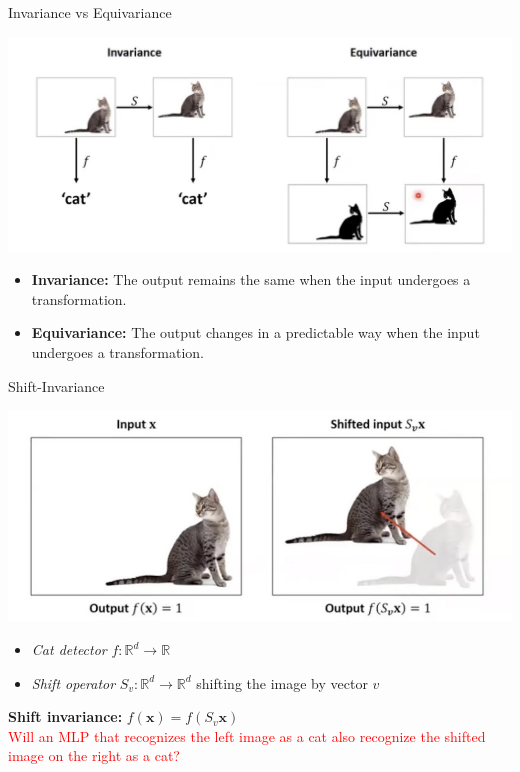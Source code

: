 \documentclass[serif, aspectratio=169]{beamer}
\begin{document}
	\begin{frame}{Invariance vs Equivariance}
		\begin{center}
			\includegraphics[keepaspectratio, scale=0.28]{pic/invariance_vs_equivariance.jpg}
		\end{center}
		\begin{itemize}
			\item \textbf{Invariance:} The output remains the same when the input undergoes a transformation.
			\item \textbf{Equivariance:} The output changes in a predictable way when the input undergoes a transformation.
			
		\end{itemize}
	\end{frame}
	\begin{frame}{Shift-Invariance}
		\begin{center}
			\includegraphics[keepaspectratio, scale=0.25]{pic/shift_invariance.jpg}
		\end{center}
		
		\begin{itemize}
			\item \textit{Cat detector} \quad $f: \mathbb{R}^d \to \mathbb{R}$
			
			\item \textit{Shift operator} \quad $S_v: \mathbb{R}^d \to \mathbb{R}^d$ \quad shifting the image by vector $v$
		\end{itemize}
		
		\textbf{Shift invariance:} \quad $f(\mathbf{x}) = f(S_v \mathbf{x})$ 
		\\ \textcolor{red}{Will an MLP that recognizes the left image as a cat also recognize the shifted image on the right as a cat?}
	\end{frame}
\end{document}

